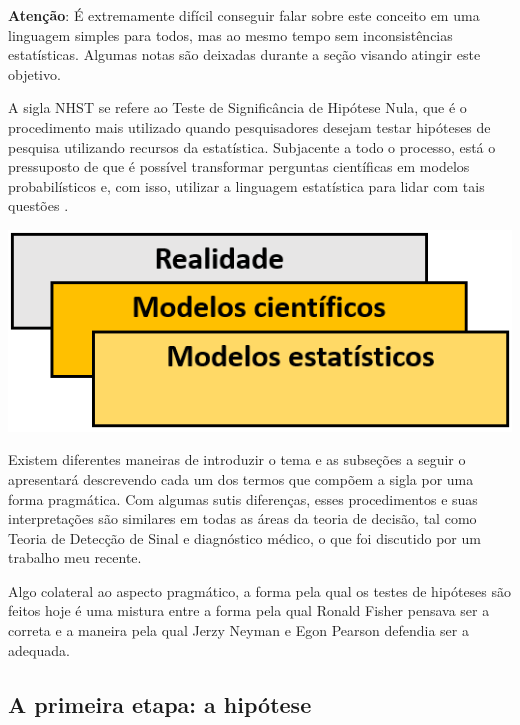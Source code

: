 \documentclass[
]{book}
\begin{document}
\begin{warning}

\textbf{Atenção}: É extremamente difícil conseguir falar sobre este conceito em uma linguagem simples para todos, mas ao mesmo tempo sem inconsistências estatísticas. Algumas notas são deixadas durante a seção visando atingir este objetivo.

\end{warning}

A sigla NHST se refere ao Teste de Significância de Hipótese Nula, que é o procedimento mais utilizado quando pesquisadores desejam testar hipóteses de pesquisa utilizando recursos da estatística. Subjacente a todo o processo, está o pressuposto de que é possível transformar perguntas científicas em modelos probabilísticos e, com isso, utilizar a linguagem estatística para lidar com tais questões \citep{Curley013}.

\includegraphics{./img/cap_inferencia_modelos_estatisticos.png}

Existem diferentes maneiras de introduzir o tema e as subseções a seguir o apresentará descrevendo cada um dos termos que compõem a sigla por uma forma pragmática. Com algumas sutis diferenças, esses procedimentos e suas interpretações são similares em todas as áreas da teoria de decisão, tal como Teoria de Detecção de Sinal e diagnóstico médico, o que foi discutido por um trabalho meu recente.

Algo colateral ao aspecto pragmático, a forma pela qual os testes de hipóteses são feitos hoje é uma mistura entre a forma pela qual Ronald Fisher pensava ser a correta e a maneira pela qual Jerzy Neyman e Egon Pearson defendia ser a adequada.

\hypertarget{a-primeira-etapa-a-hipuxf3tese}{%
\subsection{A primeira etapa: a hipótese}\label{a-primeira-etapa-a-hipuxf3tese}}
\end{document}
